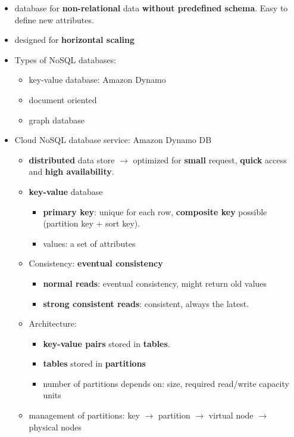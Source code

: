 \begin{itemize}
	\item database for \textbf{non-relational} data \textbf{without predefined schema}. Easy to define new attributes.
	\item designed for \textbf{horizontal scaling}
	\item Types of NoSQL databases:
	\begin{itemize}
		\item key-value database: Amazon Dynamo
		\item document oriented
		\item graph database
	\end{itemize}
	\item Cloud NoSQL database service: Amazon Dynamo DB
	\begin{itemize}
		\item \textbf{distributed} data store $\rightarrow$ optimized for \textbf{small} request, \textbf{quick} access and \textbf{high availability}.
		\item \textbf{key-value} database
		\begin{itemize}
			\item \textbf{primary key}: unique for each row, \textbf{composite key} possible (partition key + sort key).
			\item values: a set of attributes
		\end{itemize}
		\item Consistency: \textbf{eventual consistency}
		\begin{itemize}
			\item \textbf{normal reads}: eventual consistency, might return old values
			\item \textbf{strong consistent reads}: consistent, always the latest.
		\end{itemize}
		\item Architecture:
		\begin{itemize}
			\item \textbf{key-value pairs} stored in \textbf{tables}. 
			\item \textbf{tables} stored in \textbf{partitions}
			\item number of partitions depends on: size, required read/write capacity units
		\end{itemize}
		\item management of partitions: key $\rightarrow$ partition $\rightarrow$ virtual node $\rightarrow$ physical nodes
		\begin{itemize}

\end{itemize}
\end{itemize}
\end{itemize}
